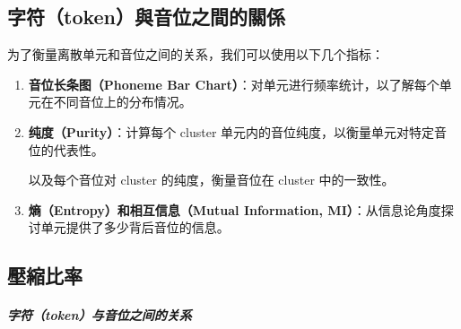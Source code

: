 \subsection{字符（token）與音位之間的關係}




为了衡量离散单元和音位之间的关系，我们可以使用以下几个指标：

\begin{enumerate}
    \item \textbf{音位长条图（Phoneme Bar Chart）}：对单元进行频率统计，以了解每个单元在不同音位上的分布情况。
    \item \textbf{纯度（Purity）}：计算每个 cluster 单元内的音位纯度，以衡量单元对特定音位的代表性。 


以及每个音位对 cluster 的纯度，衡量音位在 cluster 中的一致性。

    \item \textbf{熵（Entropy）和相互信息（Mutual Information, MI）}：从信息论角度探讨单元提供了多少背后音位的信息。 

\end{enumerate}

\subsection{壓縮比率}



\subparagraph{字符（token）与音位之间的关系}

